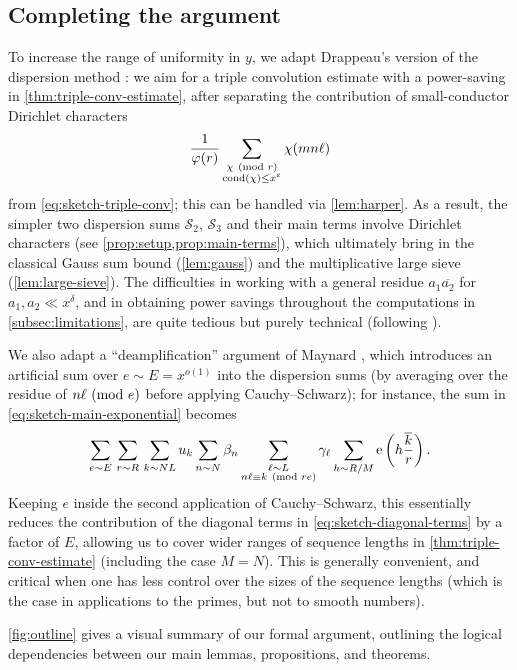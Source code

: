 \documentclass[reqno,11pt]{amsart}
\theoremstyle{definition}
\theoremstyle{remark}
\numberwithin{equation}{section}
\newcommand{\mS}{\mathcal{S}}
\newcommand{\e}{\textnormal{e}}
\newcommand{\eps}{\varepsilon}
\renewcommand{\bar}{\overline}
\newcommand{\cond}{\textnormal{cond}}
\renewcommand{\pmod}[1]{\ (\textnormal{mod } #1)}
\begin{document}
\subsection{Completing the argument}

To increase the range of uniformity in $y$, we adapt Drappeau's version of the dispersion method \cite{drappeau2015theoremes}: we aim for a triple convolution estimate with a power-saving in \cref{thm:triple-conv-estimate}, after separating the contribution of small-conductor Dirichlet characters
\[
    \frac{1}{\varphi(r)} \sum_{\substack{\chi \pmod{r} \\ \cond(\chi) \le x^\eps}} \chi(mn\ell)
\]
from \cref{eq:sketch-triple-conv}; this can be handled via \cref{lem:harper}. As a result, the simpler two dispersion sums $\mS_2$, $\mS_3$ and their main terms involve Dirichlet characters (see \cref{prop:setup,prop:main-terms}), which ultimately bring in the classical Gauss sum bound (\cref{lem:gauss}) and the multiplicative large sieve (\cref{lem:large-sieve}). The difficulties in working with a general residue $a_1 \bar{a_2}$ for $a_1, a_2 \ll x^\delta$, and in obtaining power savings throughout the computations in \cref{subsec:limitations}, are quite tedious but purely technical (following \cite{drappeau2015theoremes}).

We also adapt a ``deamplification'' argument of Maynard \cite{maynard2020primes}, which introduces an artificial sum over $e \sim E = x^{o(1)}$ into the dispersion sums (by averaging over the residue of $n\ell \pmod{e}$ before applying Cauchy--Schwarz); for instance, the sum in \cref{eq:sketch-main-exponential} becomes
\[
    \sum_{e \sim E}\, 
    \sum_{r \sim R}\,
    \sum_{k \sim NL} u_k
    \sum_{n \sim N} \beta_n
    \sum_{\substack{\ell \sim L \\ n\ell \equiv k \pmod{re}}} \gamma_\ell
    \sum_{h \sim R/M} \e\left(h \frac{\bar{k}}{r} \right).
\]
Keeping $e$ inside the second application of Cauchy--Schwarz, this essentially reduces the contribution of the diagonal terms in \cref{eq:sketch-diagonal-terms} by a factor of $E$, allowing us to cover wider ranges of sequence lengths in \cref{thm:triple-conv-estimate} (including the case $M = N$).
This is generally convenient, and critical when one has less control over the sizes of the sequence lengths (which is the case in applications to the primes, but not to smooth numbers). 

\cref{fig:outline} gives a visual summary of our formal argument, outlining the logical dependencies between our main lemmas, propositions, and theorems.
\end{document}
